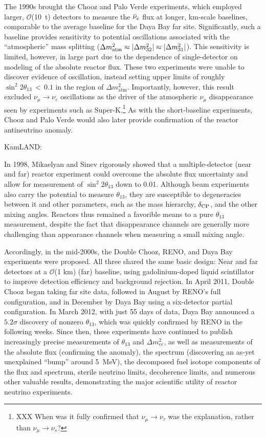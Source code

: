 \documentclass[../thesis.tex]{subfiles}
\begin{document}
The 1990s brought the Chooz and Palo Verde experiments, which employed larger, $\mathcal{O}$(10~t) detectors to measure the $\bar\nu_e$ flux at longer, km-scale baselines, comparable to the average baseline for the Daya Bay far site. Significantly, such a baseline provides sensitivity to potential oscillations associated with the ``atmospheric'' mass splitting ($\Delta m^2_{\mathrm{atm}} \approx \lvert \Delta m^2_{32}\rvert \approx \lvert \Delta m^2_{31}\rvert$). This sensitivity is limited, however, in large part due to the dependence of single-detector on modeling of the absolute reactor flux. These two experiments were unable to discover evidence of oscillation, instead setting upper limits of roughly $\sin^2 2\theta_{13}\,<\,0.1$ in the region of $\Delta m^2_{\mathrm{atm}}$. Importantly, however, this result excluded $\nu_\mu \rightarrow \nu_e$ oscillations as the driver of the atmospheric $\nu_\mu$ disappearance seen by experiments such as Super-K.\footnote{XXX When was it fully confirmed that $\nu_\mu \rightarrow \nu_\tau$ was the explanation, rather than $\nu_\mu \rightarrow \nu_s$? } As with the short-baseline experiments, Chooz and Palo Verde would also later provide confirmation of the reactor antineutrino anomaly.

KamLAND:

In 1998, Mikaelyan and Sinev rigorously showed that a multiple-detector (near and far) reactor experiment could overcome the absolute flux uncertainty and allow for measurement of $\sin^2 2\theta_{13}$ down to 0.01. Although beam experiments also carry the potential to measure $\theta_{13}$, they are susceptible to degeneracies between it and other parameters, such as the mass hierarchy, $\delta_\text{CP}$, and the other mixing angles. Reactors thus remained a favorible means to a pure $\theta_{13}$ measurement, despite the fact that disappearance channels are generally more challenging than appearance channels when measuring a small mixing angle.

Accordingly, in the mid-2000s, the Double Chooz, RENO, and Daya Bay experiments were proposed. All three shared the same basic design: Near and far detectors at a $\mathcal{O}$(1 km) (far) baseline, using gadolinium-doped liquid scintillator to improve detection efficiency and background rejection. In April 2011, Double Chooz began taking far site data, followed in August by RENO's full configuration, and in December by Daya Bay using a six-detector partial configuration. In March 2012, with just 55 days of data, Daya Bay announced a $5.2\sigma$ discovery of nonzero $\theta_{13}$, which was quickly confirmed by RENO in the following weeks. Since then, these experiments have continued to publish increasingly precise measurements of $\theta_{13}$ and $\Delta m^2_{ee}$, as well as measurements of the absolute flux (confirming the anomaly), the spectrum (discovering an as-yet unexplained ``bump'' around 5~MeV), the decomposed fuel isotope components of the flux and spectrum, sterile neutrino limits, decoherence limits, and numerous other valuable results, demonstrating the major scientific utility of reactor neutrino experiments.
\end{document}
